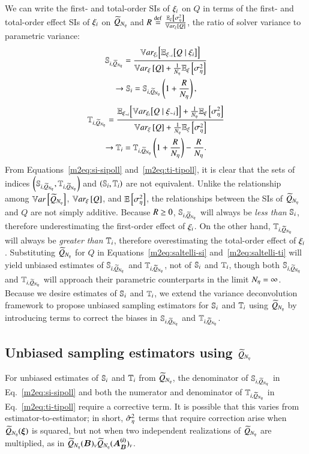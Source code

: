 We can write the first- and total-order SIs of $\xii$ on $Q$ in terms of the first- and total-order effect SIs of $\xii$ on $\Qpoll$ and $\tempsymbol \defin \frac{\EExi{\Sigsqeta}}{\Vxi{Q}}$, the ratio of solver variance to parametric variance:
\begin{gather} \nonumber
    \Spoll{i} = \frac{\VEi{Q \mid \xii}}{\Vxi{Q} + \frac{1}{\Neta}\EExi{\Sigsqeta}} \\ \label{m2eq:si-sipoll}
    \rightarrow \S{i} = \Spoll{i} \left( 1 + \frac{\tempsymbol}{\Neta} \right) ,
\end{gather}
\begin{gather} \nonumber
    \Tpoll{i} = \frac{\EVni{Q \mid \xini} + \frac{1}{\Neta}\EExi{\Sigsqeta}}{\Vxi{Q} + \frac{1}{\Neta}\EExi{\Sigsqeta}} \\ \label{m2eq:ti-tipoll}
    \rightarrow \T{i} = \Tpoll{i}\left( 1 + \frac{\tempsymbol}{\Neta} \right) - \frac{\tempsymbol}{\Neta} .
\end{gather}
%
From Equations~\eqref{m2eq:si-sipoll} and~\eqref{m2eq:ti-tipoll}, it is clear that the sets of indices $\left(\Spoll{i}, \Tpoll{i} \right)$ and $\left(\S{i}, \T{i}\right)$ are not equivalent. 
Unlike the relationship among $\Var{\Qpoll}$, $\Vxi{Q}$, and $\EE{\Sigsqeta}$, the relationships between the SIs of $\Qpoll$ and $Q$ are not simply additive.
Because $\tempsymbol \geq 0$, $\Spoll{i}$ will always be \emph{less than} $\S{i}$, therefore underestimating the first-order effect of $\xii$.
On the other hand, $\Tpoll{i}$ will always be \emph{greater than} $\T{i}$, therefore overestimating the total-order effect of $\xii$. 
%
Substituting $\Qpoll$ for $Q$ in Equations~\eqref{m2eq:saltelli-si} and~\eqref{m2eq:saltelli-ti} will yield unbiased estimates of $\Spoll{i}$ and $\Tpoll{i}$, not of $\S{i}$ and $\T{i}$, though both $\Spoll{i}$ and $\Tpoll{i}$ will approach their parametric counterparts in the limit $\Neta=\infty$.
Because we desire estimates of $\S{i}$ and $\T{i}$, we extend the variance deconvolution framework to propose unbiased sampling estimators for $\S{i}$ and $\T{i}$ using $\Qpoll$ by introducing terms to correct the biases in $\Spoll{i}$ and $\Tpoll{i}$. 


\subsection{Unbiased sampling estimators using \texorpdfstring{$\Qpoll$}{Qpoll}}
For unbiased estimates of $\S{i}$ and $\T{i}$ from $\Qpoll$, the denominator of $\Spoll{i}$ in Eq.~\eqref{m2eq:si-sipoll} and both the numerator and denominator of $\Tpoll{i}$ in Eq.~\eqref{m2eq:ti-tipoll} require a corrective term.
It is possible that this varies from estimator-to-estimator; 
in short, $\hatSigsqeta$ terms that require correction arise when $\Qpoll(\bxi)$ is squared, but not when two independent realizations of $\Qpoll$ are multiplied, as in $\Qpoll(\bm{B})_v \Qpoll(\bm{A_B^{(i)}})_v$. 


